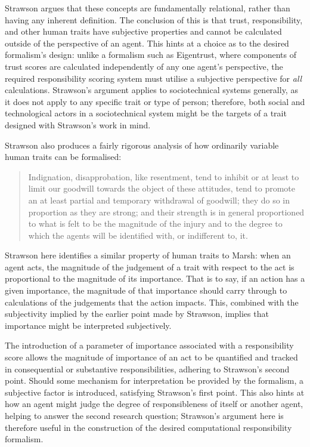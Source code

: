 Strawson argues that these concepts are fundamentally relational, rather than having any inherent definition. The conclusion of this is that trust, responsibility, and other human traits have subjective properties and cannot be calculated outside of the perspective of an agent. This hints at a choice as to the desired formalism's design: unlike a formalism such as Eigentrust, where components of trust scores are calculated independently of any one agent's perspective, the required responsibility scoring system must utilise a subjective perspective for \emph{all} calculations. Strawson's argument applies to sociotechnical systems generally, as it does not apply to any specific trait or type of person; therefore, both social and technological actors in a sociotechnical system might be the targets of a trait designed with Strawson's work in mind.\par

Strawson also produces a fairly rigorous analysis of how ordinarily variable human traits can be formalised:

\begin{quotation}
    Indignation, disapprobation, like resentment, tend to inhibit or at least to limit our goodwill towards the object of these attitudes, tend to promote an at least partial and temporary withdrawal of goodwill; they do so in proportion as they are strong; and their strength is in general proportioned to what is felt to be the magnitude of the injury and to the degree to which the agents will be identified with, or indifferent to, it.\cite{strawson}
\end{quotation}

Strawson here identifies a similar property of human traits to Marsh: when an agent acts, the magnitude of the judgement of a trait with respect to the act is proportional to the magnitude of its importance. That is to say, if an action has a given importance, the magnitude of that importance should carry through to calculations of the judgements that the action impacts. This, combined with the subjectivity implied by the earlier point made by Strawson, implies that importance might be interpreted subjectively.\par

The introduction of a parameter of importance associated with a responsibility score allows the magnitude of importance of an act to be quantified and tracked in consequential or substantive responsibilities, adhering to Strawson's second point. Should some mechanism for interpretation be provided by the formalism, a subjective factor is introduced, satisfying Strawson's first point. This also hints at how an agent might judge the degree of responsibleness of itself or another agent, helping to answer the second research question; Strawson's argument here is therefore useful in the construction of the desired computational responsibility formalism.\par

